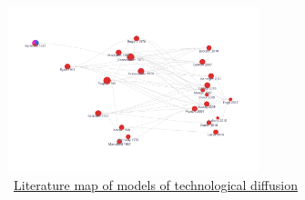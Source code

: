 \begin{figure}[!ht] \centering  %
	\caption{ ~\href{https://app.litmaps.co/shared/1D9003CB-75FE-4633-B60A-79B70E03B691}{Literature map of models of technological diffusion}}
	\label{fig:graph_diffusion}
	\centerline{\includegraphics[width=0.65\textwidth]{./figures/graph_diffusion}}
\end{figure}